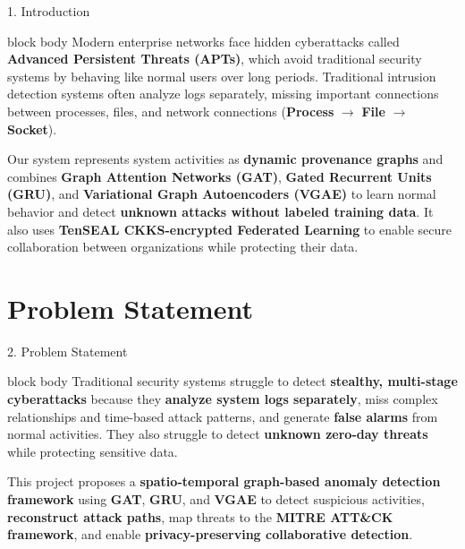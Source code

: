 \documentclass[aspectratio=169,10pt]{beamer}
\begin{document}
\begin{frame}{1. Introduction}
\vspace{0.6em}
\begin{beamercolorbox}[rounded=true,shadow=false,sep=0.80em,wd=\textwidth]{block body}
\fontsize{9.2pt}{14.5pt}\selectfont
Modern enterprise networks face hidden cyberattacks called \textbf{Advanced Persistent Threats (APTs)}, which avoid traditional security systems by behaving like normal users over long periods. Traditional intrusion detection systems often analyze logs separately, missing important connections between processes, files, and network connections (\textbf{Process} $\rightarrow$ \textbf{File} $\rightarrow$ \textbf{Socket}).

\vspace{0.4em}
Our system represents system activities as \textbf{dynamic provenance graphs} and combines \textbf{Graph Attention Networks (GAT)}, \textbf{Gated Recurrent Units (GRU)}, and \textbf{Variational Graph Autoencoders (VGAE)} to learn normal behavior and detect \textbf{unknown attacks without labeled training data}. It also uses \textbf{TenSEAL CKKS-encrypted Federated Learning} to enable secure collaboration between organizations while protecting their data.
\end{beamercolorbox}
\end{frame}

\section{Problem Statement}

\begin{frame}{2. Problem Statement}
\vspace{0.6em}
\begin{beamercolorbox}[rounded=true,shadow=false,sep=0.85em,wd=\textwidth]{block body}
\fontsize{9.3pt}{14.8pt}\selectfont
Traditional security systems struggle to detect \textbf{stealthy, multi-stage cyberattacks} because they \textbf{analyze system logs separately}, miss complex relationships and time-based attack patterns, and generate \textbf{false alarms} from normal activities. They also struggle to detect \textbf{unknown zero-day threats} while protecting sensitive data.

\vspace{0.4em}
This project proposes a \textbf{spatio-temporal graph-based anomaly detection framework} using \textbf{GAT}, \textbf{GRU}, and \textbf{VGAE} to detect suspicious activities, \textbf{reconstruct attack paths}, map threats to the \textbf{MITRE ATT\&CK framework}, and enable \textbf{privacy-preserving collaborative detection}.
\end{beamercolorbox}
\end{frame}
\end{document}

